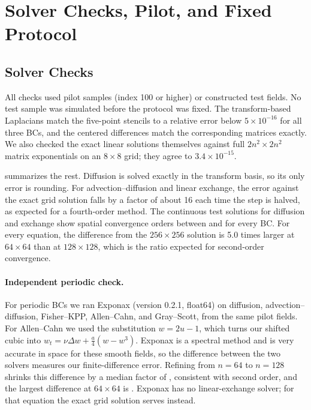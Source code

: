 \section{Solver Checks, Pilot, and Fixed Protocol}
\label{app:validation}
\subsection{Solver Checks}
All checks used pilot samples (index 100 or higher) or constructed test fields. No test sample was simulated before the protocol was fixed. The transform-based Laplacians match the five-point stencils to a relative error below $5\times10^{-16}$ for all three BCs, and the centered differences match the corresponding matrices exactly. We also checked the exact linear solutions themselves against full $2n^2\times2n^2$ matrix exponentials on an $8\times8$ grid; they agree to $3.4\times10^{-15}$.

 summarizes the rest. Diffusion is solved exactly in the transform basis, so its only error is rounding. For advection--diffusion and linear exchange, the error against the exact grid solution falls by a factor of about 16 each time the step is halved, as expected for a fourth-order method. The continuous test solutions for diffusion and exchange show spatial convergence orders between \valOrderMin{} and \valOrderMax{} for every BC. For every equation, the difference from the $256\times256$ solution is 5.0 times larger at $64\times64$ than at $128\times128$, which is the ratio expected for second-order convergence.



\paragraph{Independent periodic check.}
For periodic BCs we ran Exponax \citep{exponax_docs} (version 0.2.1, float64) on diffusion, advection--diffusion, Fisher--KPP, Allen--Cahn, and Gray--Scott, from the same pilot fields. For Allen--Cahn we used the substitution $w=2u-1$, which turns our shifted cubic into $w_t=\nu\Delta w+\tfrac a4(w-w^3)$. Exponax is a spectral method and is very accurate in space for these smooth fields, so the difference between the two solvers measures our finite-difference error. Refining from $n=64$ to $n=128$ shrinks this difference by a median factor of \expoRatio{}, consistent with second order, and the largest difference at $64\times64$ is \expoMax{}. Exponax has no linear-exchange solver; for that equation the exact grid solution serves instead.


